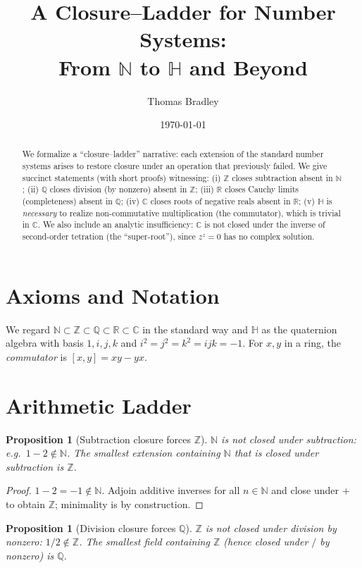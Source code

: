 \documentclass[12pt,a4paper]{article}
\title{A Closure--Ladder for Number Systems:\\
From $\mathbb{N}$ to $\mathbb{H}$ and Beyond}
\author{Thomas Bradley}
\date{\today}
\newtheorem{proposition}[theorem]{Proposition}
\theoremstyle{definition}
\theoremstyle{remark}
\begin{document}
\maketitle

\begin{abstract}
We formalize a ``closure--ladder'' narrative: each extension of the standard number systems arises to restore closure under an operation that previously failed. We give succinct statements (with short proofs) witnessing: (i) $\mathbb{Z}$ closes subtraction absent in $\mathbb{N}$; (ii) $\mathbb{Q}$ closes division (by nonzero) absent in $\mathbb{Z}$; (iii) $\mathbb{R}$ closes Cauchy limits (completeness) absent in $\mathbb{Q}$; (iv) $\mathbb{C}$ closes roots of negative reals absent in $\mathbb{R}$; (v) $\mathbb{H}$ is \emph{necessary} to realize non-commutative multiplication (the commutator), which is trivial in $\mathbb{C}$. We also include an analytic insufficiency: $\mathbb{C}$ is not closed under the inverse of second-order tetration (the ``super-root''), since $z^z = 0$ has no complex solution.
\end{abstract}

\section{Axioms and Notation}
We regard $\mathbb{N}\subset\mathbb{Z}\subset\mathbb{Q}\subset\mathbb{R}\subset\mathbb{C}$ in the standard way and $\mathbb{H}$ as the quaternion algebra with basis $1,i,j,k$ and $i^2=j^2=k^2=ijk=-1$.
For $x,y$ in a ring, the \emph{commutator} is $[x,y]=xy-yx$.

\section{Arithmetic Ladder}
\begin{proposition}[Subtraction closure forces $\mathbb{Z}$]
\label{prop:Zclosesub}
$\mathbb{N}$ is not closed under subtraction: e.g.\ $1-2\notin\mathbb{N}$. The smallest extension containing $\mathbb{N}$ that is closed under subtraction is $\mathbb{Z}$.
\end{proposition}

\begin{proof}
$1-2=-1\notin\mathbb{N}$. Adjoin additive inverses for all $n\in\mathbb{N}$ and close under $+$ to obtain $\mathbb{Z}$; minimality is by construction.
\end{proof}

\begin{proposition}[Division closure forces $\mathbb{Q}$]
\label{prop:Qclosediv}
$\mathbb{Z}$ is not closed under division by nonzero: $1/2\notin\mathbb{Z}$. The smallest field containing $\mathbb{Z}$ (hence closed under $/$ by nonzero) is $\mathbb{Q}$.
\end{proposition}
\end{document}
